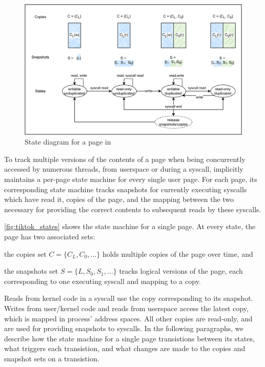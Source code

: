 \documentclass[letterpaper,twocolumn,10pt, anonymous]{article}
\begin{document}
\begin{figure}[]
  \includegraphics[width=\linewidth]{img/tiktok_states.pdf}
  \caption{State diagram for a page in \tiktok}
  \label{fig:tiktok_states}
\end{figure}

To track multiple versions of the contents of a page when being concurrently 
accessed by numerous threads, from userspace or during a syscall,
\tiktok implicitly maintains a per-page state machine for every single 
user page.
For each page, its corresponding state machine tracks snapshots for currently 
executing syscalls which have read it, copies of the page, and the mapping 
between the two necessary for providing the correct contents to subsequent reads 
by these syscalls.

\autoref{fig:tiktok_states} shows the state machine for a single page.
At every state, the page has two associated sets:
\begin{inparaenum}
  \item the copies set $C = \{C_L, C_0, \dots\}$ holds multiple copies of the page over time, and
  \item the snapshots set $S = \{L, S_0, S_1, \dots\}$ tracks logical versions of the page, each corresponding to one executing syscall and mapping to a copy. 
\end{inparaenum}
Reads from kernel code in a syscall use the copy corresponding to its snapshot.
Writes from user/kernel code and reads from userspace access the latest 
copy, which is mapped in process' address spaces.
All other copies are read-only, and are used for providing snapshots to syscalls.
In the following paragraphs, we describe how the state machine for a single page 
transistions between its states, what triggers each transistion, and what 
changes are made to the copies and snapshot sets on a transistion.
\end{document}

